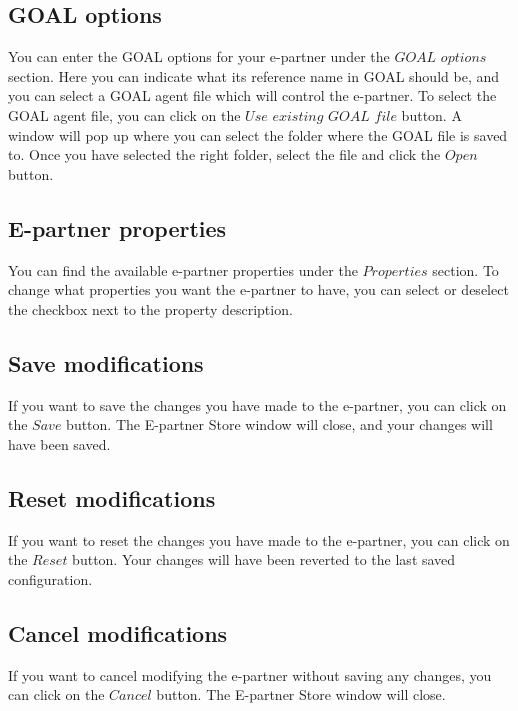 \documentclass[a4paper]{article}
\begin{document}
\subsection{GOAL options}
You can enter the GOAL options for your e-partner under the $GOAL$ $options$ section. Here you can indicate what its reference name in GOAL should be, and you can select a GOAL agent file which will control the e-partner. To select the GOAL agent file, you can click on the $Use$ $existing$ $GOAL$ $file$ button. A window will pop up where you can select the folder where the GOAL file is saved to. Once you have selected the right folder, select the file and click the $Open$ button.

\subsection{E-partner properties}
You can find the available e-partner properties under the $Properties$ section. To change what properties you want the e-partner to have, you can select or deselect the checkbox next to the property description.

\subsection{Save modifications}
If you want to save the changes you have made to the e-partner, you can click on the $Save$ button. The E-partner Store window will close, and your changes will have been saved.

\subsection{Reset modifications}
If you want to reset the changes you have made to the e-partner, you can click on the $Reset$ button. Your changes will have been reverted to the last saved configuration.

\subsection{Cancel modifications}
If you want to cancel modifying the e-partner without saving any changes, you can click on the $Cancel$ button. The E-partner Store window will close.
\end{document}
